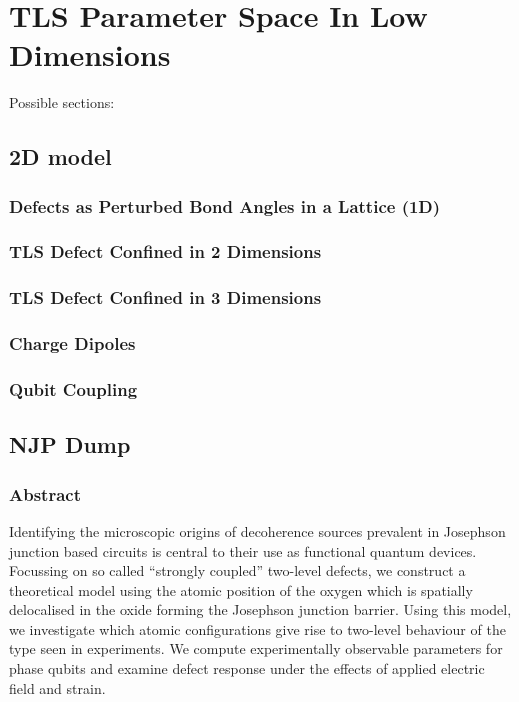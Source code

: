 \versoquote{\raisebox{-1.5em}{\resizebox{!}{2.15em}{}}}{\raisebox{-0.7em}{\resizebox{!}{1.7em}{}}}
\chapter[TLSs In Low Dimensions]{TLS Parameter Space In Low Dimensions}\label{ch:lowdims}

Possible sections:

\section{2D model}
\subsection{Defects as Perturbed Bond Angles in a Lattice (1D)}
\subsection{TLS Defect Confined in 2 Dimensions}
\subsection{TLS Defect Confined in 3 Dimensions}
\subsection{Charge Dipoles}
\subsection{Qubit Coupling}

\section{NJP Dump}
\subsection{Abstract}
Identifying the microscopic origins of decoherence sources prevalent in Josephson junction based circuits is central to their use as functional quantum devices.
Focussing on so called ``strongly coupled'' two-level defects, we construct a theoretical model using the atomic position of the oxygen which is spatially delocalised in the oxide forming the Josephson junction barrier.
Using this model, we investigate which atomic configurations give rise to two-level behaviour of the type seen in experiments.
We compute experimentally observable parameters for phase qubits and examine defect response under the effects of applied electric field and strain.


